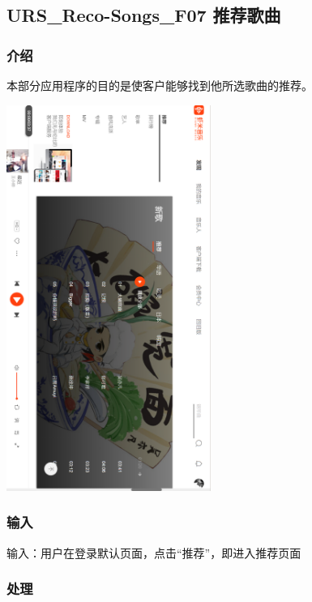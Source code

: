    \subsection{URS\_Reco-Songs\_F07 推荐歌曲}

   \subsubsection{介绍}
   
   本部分应用程序的目的是使客户能够找到他所选歌曲的推荐。
   \begin{center} 
	\begin{sideways}
	\includegraphics[width=0.5\textwidth]{./figures/capture10.png} 
	\end{sideways}
	\end{center}
   \subsubsection{输入}
   
   输入：用户在登录默认页面，点击“推荐”，即进入推荐页面
   
   \subsubsection{处理}
   

